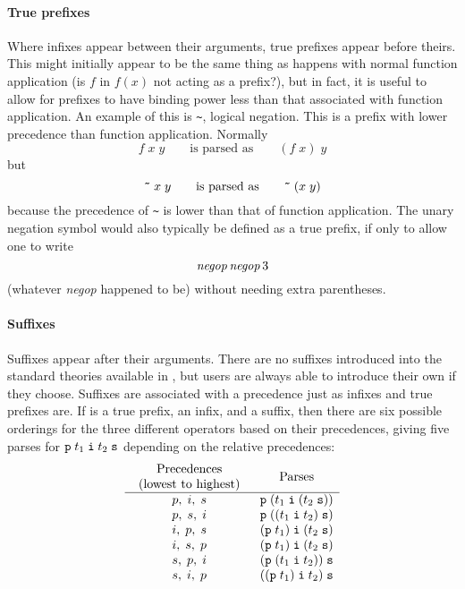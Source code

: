 \paragraph{True prefixes}

Where infixes appear between their arguments, true prefixes appear
before theirs.  This might initially appear to be the same thing as
happens with normal function application (is $f$ in $f(x)$ not acting
as a prefix?), but in fact, it is useful to allow for prefixes to have
binding power less than that associated with function application.  An
example of this is \verb+~+, logical negation.  This is a prefix with
lower precedence than function application.  Normally
\[
   f\;x\; y\qquad \mbox{is parsed as}\qquad (f\; x)\; y
\] but \[
  \holtxt{\~{}}\; x\; y\qquad\mbox{is parsed as}\qquad
  \holtxt{\~{}}\; (x\; y)
\] because the precedence of \verb+~+ is lower than that of function
application.  The unary negation symbol would also typically be
defined as a true prefix, if only to allow one to write \[ {\it
  negop}\,{\it negop}\,3
\] (whatever {\it negop} happened to be) without needing extra parentheses.

\paragraph{Suffixes}

Suffixes appear after their arguments.  There are no suffixes
introduced into the standard theories available in \HOL{}, but users
are always able to introduce their own if they choose.  Suffixes are
associated with a precedence just as infixes and true prefixes are.
If  is a true prefix,  an infix, and  a
suffix, then there are six possible orderings for the three different
operators based on their precedences, giving five parses for
$\holtxt{p}\; t_1\; \holtxt{i}\; t_2\; \holtxt{s}$ depending on the
relative precedences:
\[
\begin{array}{cl}
\mbox{\begin{tabular}{c}Precedences\\(lowest to highest)\end{tabular}} &
\multicolumn{1}{c}{\mbox{Parses}}\\
\hline
p,\;i,\;s & \holtxt{p}\;(t_1\;\holtxt{i}\;(t_2\;\holtxt{s}))\\
p,\;s,\;i & \holtxt{p}\;((t_1\;\holtxt{i}\;t_2)\;\holtxt{s})\\
i,\;p,\;s & (\holtxt{p}\;t_1)\;\holtxt{i}\;(t_2\;\holtxt{s})\\
i,\;s,\;p & (\holtxt{p}\;t_1)\;\holtxt{i}\;(t_2\;\holtxt{s})\\
s,\;p,\;i & (\holtxt{p}\;(t_1\;\holtxt{i}\;t_2))\;\holtxt{s}\\
s,\;i,\;p & ((\holtxt{p}\;t_1)\;\holtxt{i}\;t_2)\;\holtxt{s}\\
\end{array}
\]

